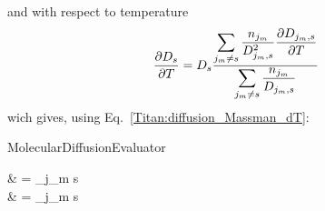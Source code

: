 and with respect to temperature
\begin{equation}
\frac{\partial D_s}{\partial T}  = D_s \frac{\displaystyle\sum_{j_m \neq s} \frac{n_{j_m}}{D_{j_m,s}^2} \frac{\partial D_{j_m,s}}{\partial T}}
                                     {\displaystyle\sum_{j_m \neq s} \frac{n_{j_m}}{D_{j_m,s}}} 
\label{Titan:Ds_dT_raw}
\end{equation}
wich gives, using Eq.~\ref{Titan:diffusion_Massman_dT}:
\begin{equationCode}{MolecularDiffusionEvaluator}
\begin{split}
 & =  
                                     {\displaystyle\sum_{j_m \neq s} }  \\[5pt]
\uu \frac{[cm^2\,s^{-1}]}{[K]} & \uu = \frac{[cm^2\,s^{-1}]}{[K]} 
                                                                       {\displaystyle\sum_{j_m \neq s}\frac{[cm^{-3}]}{[cm^2\,s^{-1}]}}
\end{split}
\label{Titan:Ds_dT}
\end{equationCode}

